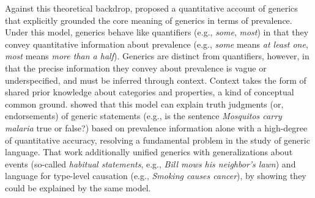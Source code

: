 \documentclass[floatsintext,man]{apa6}
\begin{document}
Against this theoretical backdrop,  proposed a quantitative account of generics that explicitly grounded the core meaning of generics in terms of prevalence. 
Under this model, generics behave like quantifiers (e.g., \textit{some}, \textit{most}) in that they convey quantitative information about prevalence (e.g., \textit{some} means \textit{at least one}, \textit{most} means \textit{more than a half}).
Generics are distinct from quantifiers, however, in that the precise information they convey about prevalence is vague or underspecified, and must be inferred through context.
Context takes the form of shared prior knowledge about categories and properties, a kind of conceptual common ground.
 showed that this model can explain truth judgments (or, endorsements) of generic statements (e.g., is the sentence \emph{Mosquitos carry malaria} true or false?) based on prevalence information alone with a high-degree of quantitative accuracy, resolving a fundamental problem in the study of generic language. 
That work additionally unified generics with generalizations about events (so-called \textit{habitual statements}, e.g., \textit{Bill mows his neighbor's lawn}) and language for type-level causation (e.g., \textit{Smoking causes cancer}), by showing they could be explained by the same model.
\end{document}
